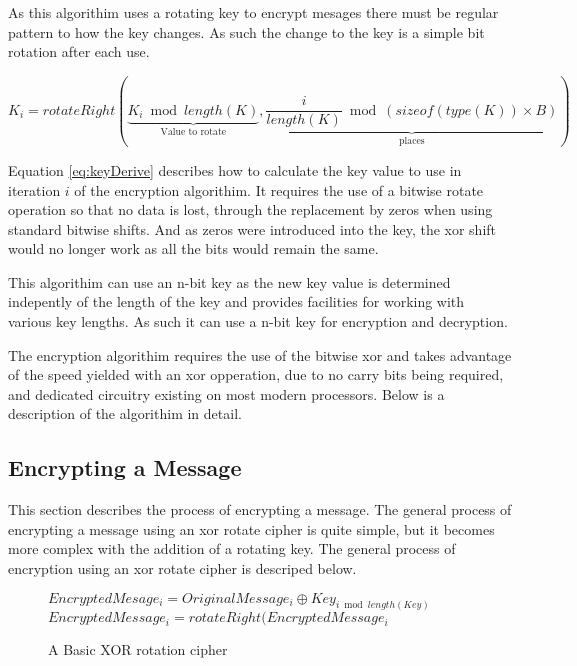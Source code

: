\documentclass[12pt]{article}
\begin{document}
  As this algorithim uses a rotating key to encrypt mesages there
  must be regular pattern to how the key changes. As such the
  change to the key is a simple bit rotation after each use. 

  \begin{equation}
    \label{eq:keyDerive}
    K_i = rotateRight(
        \underbrace{K_i \bmod length(K)}_\text{Value to rotate},
        \underbrace{\frac{i}{length(K)} \bmod (sizeof(type(K)) 
            \times B)}_\text{places}) 
  \end{equation}

  Equation \eqref{eq:keyDerive} describes how to calculate the key value to use
  in iteration \( i \) of the encryption algorithim. It requires the use
  of a bitwise rotate operation so that no data is lost, through the
  replacement by zeros when using standard bitwise shifts. And as zeros
  were introduced into the key, the xor shift would no longer work as
  all the bits would remain the same.

  This algorithim can use an n-bit key as the new key value is
  determined indepently of the length of the key and provides
  facilities for working with various key lengths. As such it can use
  a n-bit key for encryption and decryption.

  The encryption algorithim requires the use of the bitwise xor and
  takes advantage of the speed yielded with an xor opperation, due to
  no carry bits being required, and dedicated circuitry existing on most
  modern processors. Below is a description of the algorithim in detail.

  \subsection{Encrypting a Message}
    This section describes the process of encrypting a message.
    The general process of encrypting a message using an xor rotate
    cipher is quite simple, but it becomes more complex with the
    addition of a rotating key. The general process of encryption
    using an xor rotate cipher is descriped below. 
    
    \begin{figure}[h]
    \begin{algorithmic}[1]
      \State $EncryptedMesage_i =
             OriginalMessage_i \oplus Key_{i \bmod length(Key)}$
      \State $EncryptedMessage_i = rotateRight(EncryptedMessage_i$
    \EndFor 
    \end{algorithmic}
    \caption{A Basic XOR rotation cipher}
    \end{figure}
\end{document}
